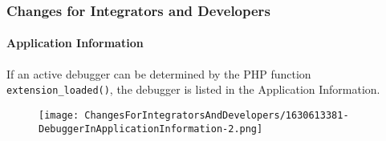 %

\begin{frame}[fragile]
	\frametitle{Changes for Integrators and Developers}
	\framesubtitle{Application Information}

	If an active debugger can be determined by the PHP function
	\texttt{extension\_loaded()}, the debugger is listed in the Application
	Information.

	\begin{figure}
		\texttt{[image: ChangesForIntegratorsAndDevelopers/1630613381-DebuggerInApplicationInformation-2.png]}
	\end{figure}

\end{frame}

